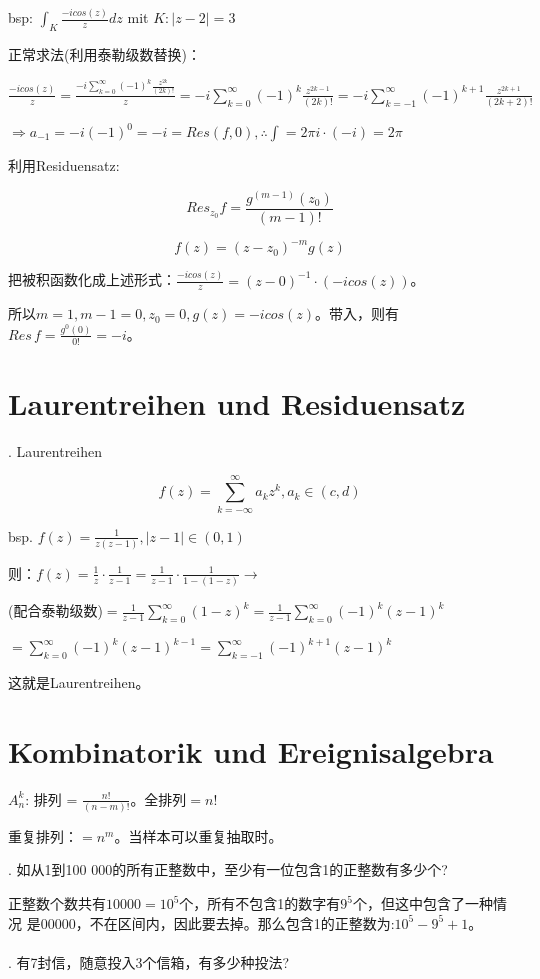 \documentclass[fleqn]{article}
\begin{document}
bsp: $\int_K\frac{-icos(z)}{z}dz$ mit $K:|z-2|=3$

正常求法(利用泰勒级数替换)：

\qquad $\frac{-icos(z)}{z}=\frac{-i\sum_{k=0}^{\infty}(-1)^k\frac{z^{2k}}{(2k)!}}{z}=-i\sum_{k=0}^{\infty}(-1)^k\frac{z^{2k-1}}{(2k)!}=-i\sum_{k=-1}^{\infty}(-1)^{k+1}\frac{z^{2k+1}}{(2k+2)!}$

\qquad $\Rightarrow a_{-1}=-i(-1)^0=-i=Res(f,0),\therefore \int = 2\pi i \cdot (-i)=2\pi$

利用Residuensatz:

$$Res_{z_0}f=\frac{g^{(m-1)}(z_0)}{(m-1)!}$$

$$f(z)=(z-z_0)^{-m}g(z)$$

\qquad 把被积函数化成上述形式：$\frac{-icos(z)}{z}= (z-0)^{-1}\cdot(-icos(z))$。

\qquad 所以$m=1,m-1=0,z_0=0,g(z)=-icos(z)$。带入，则有$Res\,f=\frac{g^0(0)}{0!}=-i$。

\section{Laurentreihen und Residuensatz}

. Laurentreihen

$$f(z)=\sum_{k=-\infty}^{\infty}a_kz^k, a_k\in(c,d)$$

bsp. $f(z)=\frac{1}{z(z-1)},|z-1|\in(0,1)$

则：$f(z)=\frac{1}{z}\cdot\frac{1}{z-1}=\frac{1}{z-1}\cdot\frac{1}{1-(1-z)}\rightarrow$

(配合泰勒级数)$=\frac{1}{z-1}\sum_{k=0}^{\infty}(1-z)^{k}=\frac{1}{z-1}\sum_{k=0}^{\infty}(-1)^{k}(z-1)^{k}$

\qquad $=\sum_{k=0}^{\infty}(-1)^{k}(z-1)^{k-1}=\sum_{k=-1}^{\infty}(-1)^{k+1}(z-1)^{k}$

\qquad 这就是Laurentreihen。


\section{Kombinatorik und Ereignisalgebra}

\noindent $A_n^k$: 排列 = $\frac{n!}{(n-m)!}$。全排列$=n!$

重复排列：$=n^m$。当样本可以重复抽取时。

. 如从1到100 000的所有正整数中，至少有一位包含1的正整数有多少个?

正整数个数共有$10000=10^5$个，所有不包含1的数字有$9^5$个，但这中包含了一种情况
是00000，不在区间内，因此要去掉。那么包含1的正整数为:$10^5-9^5+1$。
\\
\\
. 有7封信，随意投入3个信箱，有多少种投法?
\end{document}
